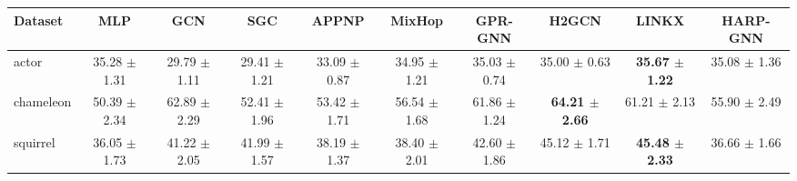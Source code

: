 \begin{tabular}{lccccccccc}
\toprule
Dataset & MLP & GCN & SGC & APPNP & MixHop & GPR-GNN & H2GCN & LINKX & HARP-GNN \\
\midrule
actor & 35.28 $\pm$ 1.31 & 29.79 $\pm$ 1.11 & 29.41 $\pm$ 1.21 & 33.09 $\pm$ 0.87 & 34.95 $\pm$ 1.21 & 35.03 $\pm$ 0.74 & 35.00 $\pm$ 0.63 & \textbf{35.67 $\pm$ 1.22} & 35.08 $\pm$ 1.36 \\
chameleon & 50.39 $\pm$ 2.34 & 62.89 $\pm$ 2.29 & 52.41 $\pm$ 1.96 & 53.42 $\pm$ 1.71 & 56.54 $\pm$ 1.68 & 61.86 $\pm$ 1.24 & \textbf{64.21 $\pm$ 2.66} & 61.21 $\pm$ 2.13 & 55.90 $\pm$ 2.49 \\
squirrel & 36.05 $\pm$ 1.73 & 41.22 $\pm$ 2.05 & 41.99 $\pm$ 1.57 & 38.19 $\pm$ 1.37 & 38.40 $\pm$ 2.01 & 42.60 $\pm$ 1.86 & 45.12 $\pm$ 1.71 & \textbf{45.48 $\pm$ 2.33} & 36.66 $\pm$ 1.66 \\
\bottomrule
\end{tabular}
